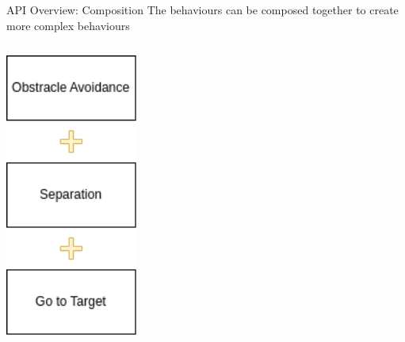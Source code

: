 \documentclass[presentation, 9pt]{beamer}\mode<presentation>{\usetheme{AMSBolognaFC}}
\begin{document}
\begin{frame}{API Overview: Composition}
The behaviours can be composed together to create more complex behaviours
\vspace{0.4cm}
\begin{columns}
\begin{column}{0.3\textwidth}
\includegraphics[width=0.7\textwidth]{img/swarm-composition.png}
\end{column}

\begin{column}{0.3\textwidth}

\end{column}

\begin{column}{0.3\textwidth}

\end{column}
\end{columns}
\end{frame}
\end{document}
